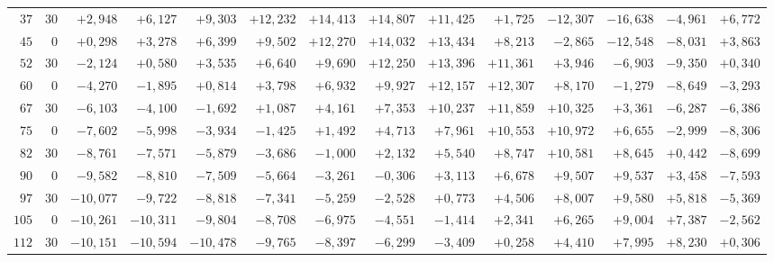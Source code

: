 \begin{landscape}
\begin{longtable}{@{}rr|r|r|r|r|r|r|r|r|r|r|r|r@{}}
\(37\) & \(30\) & \(+2{,}948\) & \(+6{,}127\) & \(+9{,}303\) & \(+12{,}232\) & \(+14{,}413\) & \(+14{,}807\) & \(+11{,}425\) & \(+1{,}725\) & \(-12{,}307\) & \(-16{,}638\) & \(-4{,}961\) & \(+6{,}772\)\\
\(45\) & \(0\) & \(+0{,}298\) & \(+3{,}278\) & \(+6{,}399\) & \(+9{,}502\) & \(+12{,}270\) & \(+14{,}032\) & \(+13{,}434\) & \(+8{,}213\) & \(-2{,}865\) & \(-12{,}548\) & \(-8{,}031\) & \(+3{,}863\)\\
\(52\) & \(30\) & \(-2{,}124\) & \(+0{,}580\) & \(+3{,}535\) & \(+6{,}640\) & \(+9{,}690\) & \(+12{,}250\) & \(+13{,}396\) & \(+11{,}361\) & \(+3{,}946\) & \(-6{,}903\) & \(-9{,}350\) & \(+0{,}340\)\\[2pt]
\(60\) & \(0\) & \(-4{,}270\) & \(-1{,}895\) & \(+0{,}814\) & \(+3{,}798\) & \(+6{,}932\) & \(+9{,}927\) & \(+12{,}157\) & \(+12{,}307\) & \(+8{,}170\) & \(-1{,}279\) & \(-8{,}649\) & \(-3{,}293\)\\
\(67\) & \(30\) & \(-6{,}103\) & \(-4{,}100\) & \(-1{,}692\) & \(+1{,}087\) & \(+4{,}161\) & \(+7{,}353\) & \(+10{,}237\) & \(+11{,}859\) & \(+10{,}325\) & \(+3{,}361\) & \(-6{,}287\) & \(-6{,}386\)\\
\(75\) & \(0\) & \(-7{,}602\) & \(-5{,}998\) & \(-3{,}934\) & \(-1{,}425\) & \(+1{,}492\) & \(+4{,}713\) & \(+7{,}961\) & \(+10{,}553\) & \(+10{,}972\) & \(+6{,}655\) & \(-2{,}999\) & \(-8{,}306\)\\
\(82\) & \(30\) & \(-8{,}761\) & \(-7{,}571\) & \(-5{,}879\) & \(-3{,}686\) & \(-1{,}000\) & \(+2{,}132\) & \(+5{,}540\) & \(+8{,}747\) & \(+10{,}581\) & \(+8{,}645\) & \(+0{,}442\) & \(-8{,}699\)\\[2pt]
\(90\) & \(0\) & \(-9{,}582\) & \(-8{,}810\) & \(-7{,}509\) & \(-5{,}664\) & \(-3{,}261\) & \(-0{,}306\) & \(+3{,}113\) & \(+6{,}678\) & \(+9{,}507\) & \(+9{,}537\) & \(+3{,}458\) & \(-7{,}593\)\\
\(97\) & \(30\) & \(-10{,}077\) & \(-9{,}722\) & \(-8{,}818\) & \(-7{,}341\) & \(-5{,}259\) & \(-2{,}528\) & \(+0{,}773\) & \(+4{,}506\) & \(+8{,}007\) & \(+9{,}580\) & \(+5{,}818\) & \(-5{,}369\)\\
\(105\) & \(0\) & \(-10{,}261\) & \(-10{,}311\) & \(-9{,}804\) & \(-8{,}708\) & \(-6{,}975\) & \(-4{,}551\) & \(-1{,}414\) & \(+2{,}341\) & \(+6{,}265\) & \(+9{,}004\) & \(+7{,}387\) & \(-2{,}562\)\\
\(112\) & \(30\) & \(-10{,}151\) & \(-10{,}594\) & \(-10{,}478\) & \(-9{,}765\) & \(-8{,}397\) & \(-6{,}299\) & \(-3{,}409\) & \(+0{,}258\) & \(+4{,}410\) & \(+7{,}995\) & \(+8{,}230\) & \(+0{,}306\)\\[2pt]

\end{longtable}
\end{landscape}
